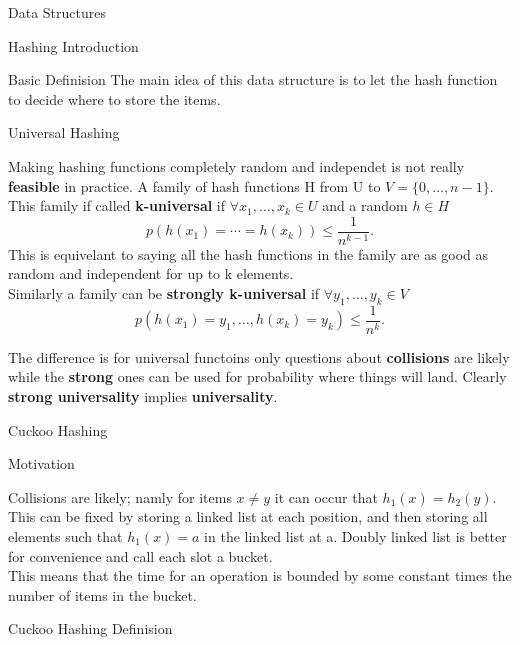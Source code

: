 \documentclass[12pt, letterpaper]{article}
\begin{document}
\begin{section}{Data Structures}
\begin{subsection}{Hashing Introduction}
\begin{subsubsection}{Basic Definision}
      The main idea of this data structure is to let the hash function to
      decide where to store the items.

    \end{subsubsection}

    \begin{subsubsection}{Universal Hashing}

      Making hashing functions completely random and independet is not really
      \textbf{feasible} in practice. A family of hash functions H from U to
      \(V = \{ 0, \dots , n - 1 \}\). This family if called
      \textbf{k-universal} if \(\forall x_{1}, \dots , x_{k} \in U\) and a
      random \(h \in H\)
      \[p(h(x_{1}) = \cdots = h(x_{k})) \leq \frac{1}{n^{k - 1}}.\]
      This is equivelant to saying all the hash functions in the family are as
      good as random and independent for up to k elements. \\
      Similarly a family can be \textbf{strongly k-universal} if \(\forall
      y_{1}, \dots , y_{k} \in V\)
      \[p(h(x_{1}) = y_{1}, \dots , h(x_{k}) = y_{k}) \leq \frac{1}{n^{k}}.\]

      The difference is for universal functoins only questions about
      \textbf{collisions} are likely while the \textbf{strong} ones can be used
      for probability where things will land. Clearly \textbf{strong
        universality} implies \textbf{universality}.

    \end{subsubsection}

  \end{subsection}

  \begin{subsection}{Cuckoo Hashing}

    \begin{subsubsection}{Motivation}

      Collisions are likely; namly for items \(x \neq y\) it can occur that
      \(h_{1}(x) = h_{2}(y)\). This can be fixed by storing a linked list at
      each position, and then storing all elements such that \(h_{1}(x) = a\)
      in the linked list at a. Doubly linked list is better for convenience
      and call each slot a bucket. \\
      This means that the time for an operation is bounded by some constant
      times the number of items in the bucket.

    \end{subsubsection}

    \begin{subsubsection}{Cuckoo Hashing Definision}


\end{subsubsection}
\end{subsection}
\end{section}
\end{document}
